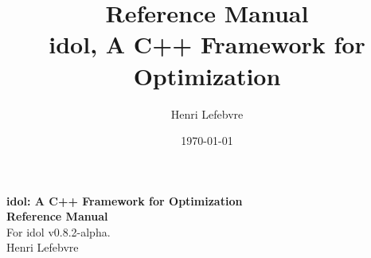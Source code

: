 \documentclass[a4paper, american, reqno]{amsbook}
\title[\textsf{idol}: A C++ Framework for Optimization]{Reference Manual\\\textsf{idol}, A C++ Framework for Optimization}
\author[H. Lefebvre]{Henri Lefebvre}
\date{\today}
\begin{document}
\begin{titlepage}

    \vspace*{7cm}

    \begin{center}
        {\huge\bfseries \textsf{idol}: A \textsf{C++} Framework for Optimization}\\[3em]
        {\LARGE\bfseries Reference Manual}\\[1em]
        
        For \textsf{idol} v0.8.2-alpha.\\[2em]

        {\large Henri Lefebvre}
    \end{center}

    \vspace*{\fill}

\end{titlepage}



\printbibliography
\end{document}
